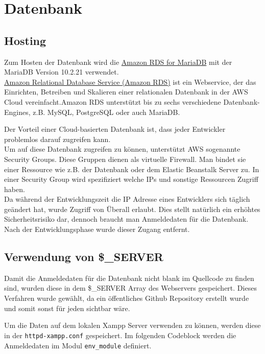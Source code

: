 \chapter{Datenbank}

\section{Hosting}
Zum Hosten der Datenbank wird die \href{https://aws.amazon.com/de/rds/mariadb/}{Amazon RDS for MariaDB} mit der MariaDB Version 10.2.21 verwendet. \\
\glqq\href{https://aws.amazon.com/de/rds/}{Amazon Relational Database Service (Amazon RDS)} ist ein Webservice, der das Einrichten, Betreiben und Skalieren einer relationalen Datenbank in der AWS Cloud vereinfacht.\grqq Amazon RDS unterstützt bis zu sechs verschiedene Datenbank-Engines, z.B. MySQL, PostgreSQL oder auch MariaDB. \cite{AmazonRDS}

Der Vorteil einer Cloud-basierten Datenbank ist, dass jeder Entwickler problemlos darauf zugreifen kann.\\
Um auf diese Datenbank zugreifen zu können, unterstützt AWS sogenannte Security Groups. Diese Gruppen dienen als virtuelle Firewall. Man bindet sie einer Ressource wie z.B. der Datenbank oder dem Elastic Beanstalk Server zu. In einer Security Group wird spezifiziert welche IPs und sonstige Ressourcen Zugriff haben.\\
Da während der Entwicklungszeit die IP Adresse eines Entwicklers sich täglich geändert hat, wurde Zugriff von Überall erlaubt. Dies stellt natürlich ein erhöhtes Sicherheitsrisiko dar, dennoch braucht man Anmeldedaten für die Datenbank. Nach der Entwicklungsphase wurde dieser Zugang entfernt.

\section{Verwendung von \$\_SERVER}
Damit die Anmeldedaten für die Datenbank nicht blank im Quellcode zu finden sind, wurden diese in dem \$\_SERVER Array des Webservers gespeichert. Dieses Verfahren wurde gewählt, da ein öffentliches Github Repository erstellt wurde und somit sonst für jeden sichtbar wäre.

Um die Daten auf dem lokalen Xampp Server verwenden zu können, werden diese in der \lstinline{httpd-xampp.conf} gespeichert. Im folgenden Codeblock werden die Anmeldedaten im Modul \lstinline{env_module} definiert.


